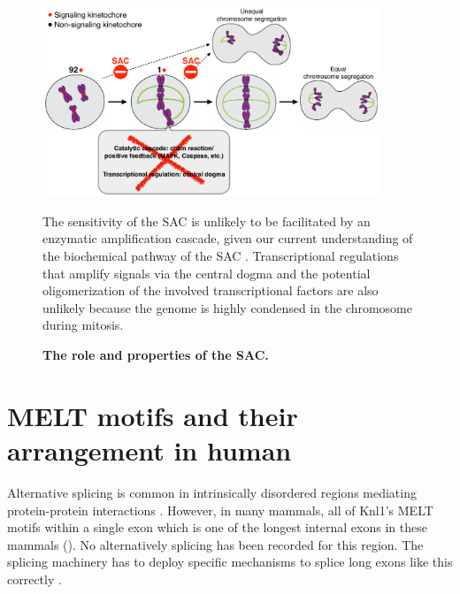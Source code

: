 \begin{figure}
    \centering
    \includegraphics[width=0.9\textwidth]{chapters/figures/SACRole.pdf}
    \caption{\textbf{The role and properties of the SAC.}}
    \noindent\justifying The sensitivity of the SAC is unlikely to be facilitated by an enzymatic amplification cascade, given our current understanding of the biochemical pathway of the SAC \cite{InhibitorUltrasensitivity, Caspase}. Transcriptional regulations that amplify signals via the central dogma and the potential oligomerization of the involved transcriptional factors \cite{TFMultimerization} are also unlikely because the genome is highly condensed in the chromosome during mitosis.
    \label{SACRole}
\end{figure}

\section{MELT motifs and their arrangement in human }

Alternative splicing is common in intrinsically disordered regions mediating protein-protein interactions \cite{DisorderedRegionsAlternativeSplicing}. However, in many mammals, all of Knl1's MELT motifs within a single exon which is one of the longest internal exons in these mammals (). No alternatively splicing has been recorded for this region. The splicing machinery has to deploy specific mechanisms to splice long exons like this correctly \cite{InternalExon}.


